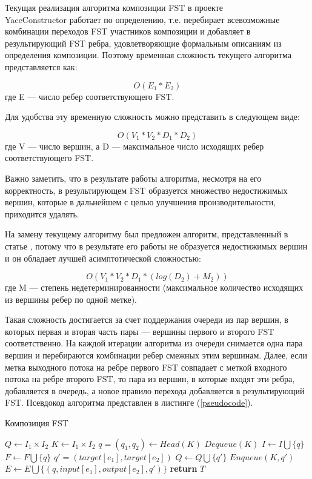 Текущая реализация алгоритма композиции FST в проекте\\ YaccConstructor работает по определению, т.е. перебирает всевозможные комбинации переходов FST участников композиции и добавляет в результирующий FST ребра, удовлетворяющие формальным описаниям из определения композиции. Поэтому временная сложность текущего алгоритма представляется как:

\[O(E_1 * E_2)\] где E — число ребер соответствующего FST.

Для удобства эту временную сложность можно представить в следующем виде:

\[O(V_1 * V_2 * D_1 * D_2)\] где V — число вершин, а D — максимальное число исходящих ребер соответствующего FST.

Важно заметить, что в результате работы алгоритма, несмотря на его корректность, в результирующем FST образуется множество недостижимых вершин, которые в дальнейшем с целью улучшения производительности, приходится удалять.

На замену текущему алгоритму был предложен алгоритм, представленный в статье \cite{handbook_automata}, потому что в результате его работы не образуется недостижимых вершин и он обладает лучшей асимптотической сложностью:

\[O(V_1 * V_2 * D_1 * (log(D_2) + M_2))\] где M — степень недетерминированности (максимальное количество исходящих из вершины ребер по одной метке).

Такая сложность достигается за счет поддержания очереди из пар вершин, в которых первая и вторая часть пары — вершины первого и второго FST соответственно. На каждой итерации алгоритма из очереди снимается одна пара вершин и перебираются комбинации ребер смежных этим вершинам. Далее, если метка выходного потока на ребре первого FST совпадает с меткой входного потока на ребре второго FST, то пара из вершин, в которые входят эти ребра, добавляется в очередь, а новое правило перехода добавляется в результирующий FST. Псевдокод алгоритма представлен в листинге (\ref{pseudocode}).

\begin{algorithm}[h]
 \caption{Композиция FST}
 \label{pseudocode}
 \begin{algorithmic}[1]
 \State $Q\gets I_1\times I_2$
 \State $K\gets I_1\times I_2$ 
   \State $q = (q_1, q_2)\gets Head(K)$
   \State $Dequeue(K)$
     \State $I \gets I \bigcup \{q\}$
   \EndIf
     \State $F \gets F \bigcup \{q\}$
   \EndIf
     \State $q' = (target[e_1], target[e_2])$
       \State $Q\gets Q \bigcup \{q'\}$
       \State $Enqueue(K, q')$
     \EndIf
     \State $E\gets E \bigcup \{(q, input[e_1], output[e_2], q')\}$
   \EndFor
 \EndWhile  
 \State \textbf{return} $T$
 \EndFunction
\end{algorithmic}
\end{algorithm}

